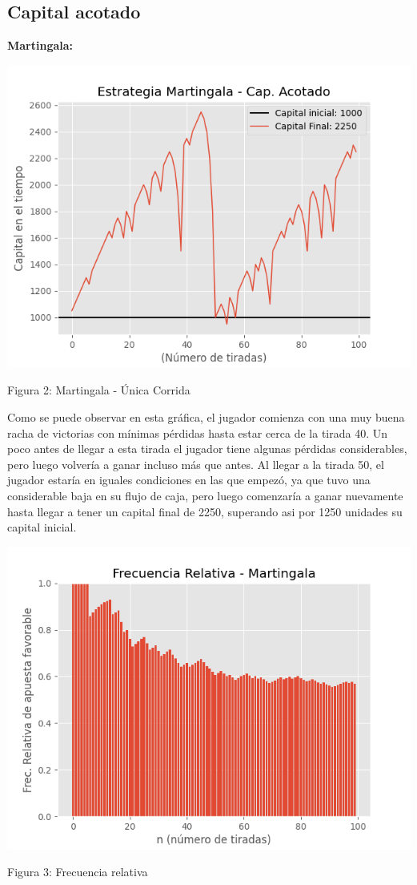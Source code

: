 \documentclass{article}
\begin{document}
\subsection{Capital acotado}

\textbf{Martingala:}

\begin{center}
    \includegraphics[width=0.7\linewidth]{MG-acotado-1tirada.png}

    \caption{Figura 2: Martingala - Única Corrida}
\end{center}

Como se puede observar en esta gráfica, el jugador comienza con una muy buena racha de victorias con mínimas pérdidas hasta estar cerca de la tirada 40. Un poco antes de llegar a esta tirada el jugador tiene algunas pérdidas considerables, pero luego volvería a ganar incluso más que antes. Al llegar a la tirada 50, el jugador estaría en iguales condiciones en las que empezó, ya que tuvo una considerable baja en su flujo de caja, pero luego comenzaría a ganar nuevamente hasta llegar a tener un capital final de 2250, superando asi por 1250 unidades su capital inicial.

\begin{center}
    \includegraphics[width=0.7\linewidth]{FreRel-MG.png}
    
    \caption{Figura 3: Frecuencia relativa}
\end{center}
\end{document}
